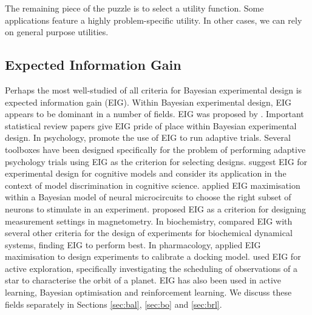 \documentclass[a4paper, 10pt]{report}
\theoremstyle{plain}
\begin{document}
	The remaining piece of the puzzle is to select a utility function. 
	Some applications feature a highly problem-specific utility.
	In other cases, we can rely on general purpose utilities.
	
	
	
	
	
	
	
	
	\subsection{Expected Information Gain}
	\label{sec:eig}
	Perhaps the most well-studied of all criteria for Bayesian experimental design is expected information gain (EIG).
	Within Bayesian experimental design, EIG appears to be dominant in a number of fields.
	EIG was proposed by \citet{lindley1956}. Important statistical review papers \citep{chaloner1995,ryan2016review} give EIG pride of place within Bayesian experimental design.
	In psychology, \citet{myung2013} promote the use of EIG to run adaptive trials. Several toolboxes \citep{watson2017quest+,vincent2017} have been designed specifically for the problem of performing adaptive psychology trials using EIG as the criterion for selecting designs. \citet{heck2019maximizing} suggest EIG for experimental design for cognitive models and \citet{cavagnaro2010adaptive} consider its application in the context of model discrimination in cognitive science. \citet{shababo2013bayesian} applied EIG maximisation within a Bayesian model of neural microcircuits to choose the right subset of neurons to stimulate in an experiment.
	\citet{dushenko2020sequential} proposed EIG as a criterion for designing measurement settings in magnetometry.
	In biochemistry, \citet{busetto2009optimized} compared EIG with several other criteria for the design of experiments for biochemical dynamical systems, finding EIG to perform best.
	In pharmacology, \citet{lyu2019ultra,foster2020unified} applied EIG maximisation to design experiments to calibrate a docking model.
	\citet{loredo2004bayesian} used EIG for active exploration, specifically investigating the scheduling of observations of a star to characterise the orbit of a planet.
	EIG has also been used in active learning, Bayesian optimisation and reinforcement learning. We discuss these fields separately in Sections \ref{sec:bal}, \ref{sec:bo} and \ref{sec:brl}.
	
\end{document}
